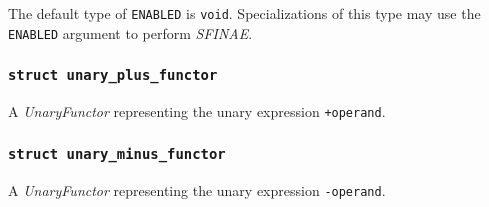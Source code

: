 \documentclass[oneside]{article}
\begin{document}
\noindent{}The default type of \verb+ENABLED+ is \verb+void+. Specializations of this type may use
the \verb+ENABLED+ argument to perform \textit{SFINAE}.

\subsubsection{\texttt{struct unary\_plus\_functor}}
A \textit{UnaryFunctor} representing the unary expression \verb|+operand|.

\subsubsection{\texttt{struct unary\_minus\_functor}}
A \textit{UnaryFunctor} representing the unary expression \verb|-operand|.
\end{document}
